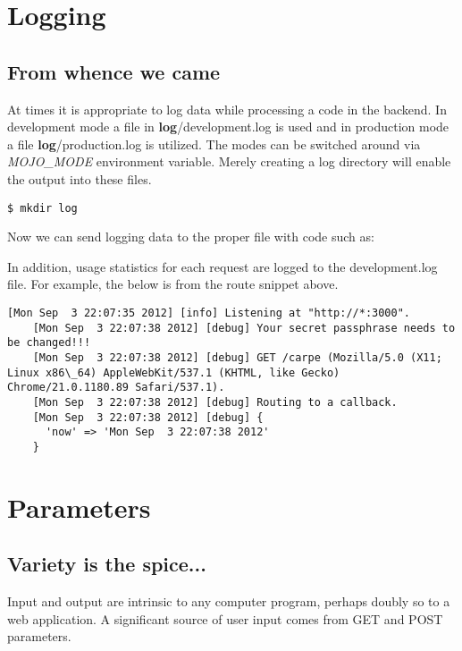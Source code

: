 \documentclass[14pt]{extreport}
\begin{document}
\section{Logging}

\subsection{From whence we came}

At times it is appropriate to log data while processing a code in the backend.
In development mode a file in \textbf{log}/development.log is used and in production
mode a file \textbf{log}/production.log is utilized. The modes can be switched around
via \textit{MOJO\_MODE} environment variable. Merely creating a log directory will enable
the output into these files.

\begin{lstlisting}[style=BashInputStyle]
$ mkdir log
\end{lstlisting}

Now we can send logging data to the proper file with code such as:



In addition, usage statistics for each request are logged to the
development.log file.  For example, the below is from the route snippet above.

\begin{lstlisting}[style=BashOutputStyle]
    [Mon Sep  3 22:07:35 2012] [info] Listening at "http://*:3000".
    [Mon Sep  3 22:07:38 2012] [debug] Your secret passphrase needs to be changed!!!
    [Mon Sep  3 22:07:38 2012] [debug] GET /carpe (Mozilla/5.0 (X11; Linux x86\_64) AppleWebKit/537.1 (KHTML, like Gecko) Chrome/21.0.1180.89 Safari/537.1).
    [Mon Sep  3 22:07:38 2012] [debug] Routing to a callback.
    [Mon Sep  3 22:07:38 2012] [debug] {
      'now' => 'Mon Sep  3 22:07:38 2012'
    }
\end{lstlisting}

\section{Parameters}

\subsection{Variety is the spice...}

Input and output are intrinsic to any computer program, perhaps doubly so to a
web application.  A significant source of user input comes from GET and POST
parameters.
\end{document}

